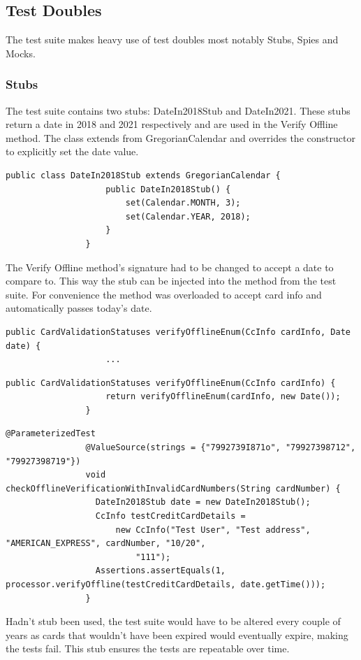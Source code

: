 \documentclass[11pt, a4paper]{article}
\begin{document}
    \subsection{Test Doubles}
        The test suite makes heavy use of test doubles most notably Stubs, Spies and Mocks.
        \subsubsection{Stubs}
            The test suite contains two stubs: DateIn2018Stub and DateIn2021. These stubs return a date in 2018 and 2021 respectively and are used in the Verify Offline method. The class extends from GregorianCalendar and overrides the constructor to explicitly set the date value.
            \begin{lstlisting}[caption=The DateIn2018Stub]
                public class DateIn2018Stub extends GregorianCalendar {
                    public DateIn2018Stub() {
                        set(Calendar.MONTH, 3);
                        set(Calendar.YEAR, 2018);
                    }
                }
            \end{lstlisting}
            The Verify Offline method's signature had to be changed to accept a date to compare to. This way the stub can be injected into the method from the test suite. For convenience the method was overloaded to accept card info and automatically passes today's date. 
            \begin{lstlisting}[caption=The Verify Offline method signature]
                public CardValidationStatuses verifyOfflineEnum(CcInfo cardInfo, Date date) {
                    ...
            \end{lstlisting}
            \begin{lstlisting}[caption=The overloaded Verify Offline method]
                public CardValidationStatuses verifyOfflineEnum(CcInfo cardInfo) {
                    return verifyOfflineEnum(cardInfo, new Date());
                }
            \end{lstlisting}
            \begin{lstlisting}[caption=An example of a test using a stub]
                @ParameterizedTest
                @ValueSource(strings = {"7992739I871o", "79927398712", "79927398719"})
                void checkOfflineVerificationWithInvalidCardNumbers(String cardNumber) {
                  DateIn2018Stub date = new DateIn2018Stub();
                  CcInfo testCreditCardDetails =
                      new CcInfo("Test User", "Test address", "AMERICAN_EXPRESS", cardNumber, "10/20",
                          "111");
                  Assertions.assertEquals(1, processor.verifyOffline(testCreditCardDetails, date.getTime()));
                }
            \end{lstlisting}
            Hadn't stub been used, the test suite would have to be altered every couple of years as cards that wouldn't have been expired would eventually expire, making the tests fail. This stub ensures the tests are repeatable over time.
\end{document}

